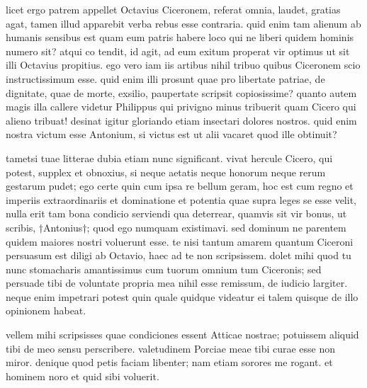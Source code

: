  licet ergo patrem appellet Octavius Ciceronem, referat omnia, laudet, gratias agat, tamen illud apparebit verba rebus esse contraria. quid enim tam alienum ab humanis sensibus est quam eum patris habere loco qui ne liberi quidem hominis numero sit? atqui co tendit, id agit, ad eum exitum properat vir optimus ut sit illi Octavius propitius. ego vero iam iis artibus nihil tribuo quibus Ciceronem scio instructissimum esse. quid enim illi prosunt quae pro libertate patriae, de dignitate, quae de morte, exsilio, paupertate scripsit copiosissime? quanto autem magis illa callere videtur Philippus qui privigno minus tribuerit quam Cicero qui alieno tribuat! desinat igitur gloriando etiam insectari dolores nostros. quid enim nostra victum esse Antonium, si victus est ut alii vacaret quod ille obtinuit?

 tametsi tuae litterae dubia etiam nunc significant. vivat hercule Cicero, qui potest, supplex et obnoxius, si neque aetatis neque honorum neque rerum gestarum pudet; ego certe quin cum ipsa re bellum geram, hoc est cum regno et imperiis extraordinariis et dominatione et potentia quae supra leges se esse velit, nulla erit tam bona condicio serviendi qua deterrear, quamvis sit vir bonus, ut scribis, †Antonius†; quod ego numquam existimavi. sed dominum ne parentem quidem maiores nostri voluerunt esse. te nisi tantum amarem quantum Ciceroni persuasum est diligi ab Octavio, haec ad te non scripsissem. dolet mihi quod tu nunc stomacharis amantissimus cum tuorum omnium tum Ciceronis; sed persuade tibi de voluntate propria mea nihil esse remissum, de iudicio largiter. neque enim impetrari potest quin quale quidque videatur ei talem quisque de illo opinionem habeat.

 vellem mihi scripsisses quae condiciones essent Atticae nostrae; potuissem aliquid tibi de meo sensu perscribere. valetudinem Porciae meae tibi curae esse non miror. denique quod petis faciam libenter; nam etiam sorores me rogant. et hominem noro et quid sibi voluerit.

